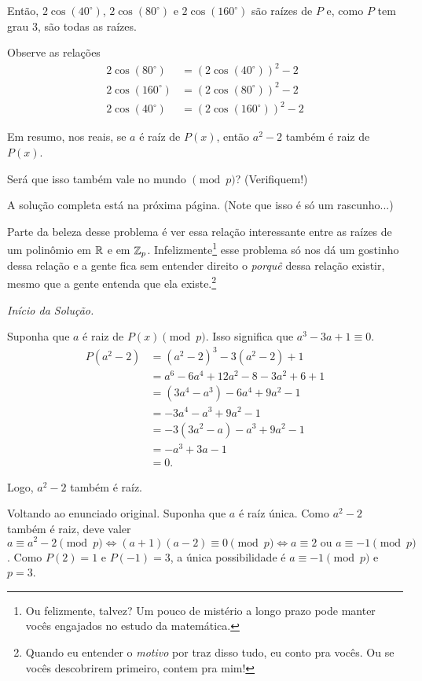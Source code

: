 \documentclass[10pt, a4paper]{article}
\begin{document}
		Então, $2\cos(40^\circ)$, $2\cos(80^\circ)$ e $2\cos(160^\circ)$ são raízes de $P$ e, como $P$ tem grau $3$, são todas as raízes.

		Observe as relações
		\begin{align*}
			2\cos(80^\circ)  & = (2\cos(40^\circ))^2 - 2\\
			2\cos(160^\circ) & = (2\cos(80^\circ))^2 - 2\\
			2\cos(40^\circ)  & = (2\cos(160^\circ))^2 - 2
		\end{align*}
	
		Em resumo, nos reais, se $a$ é raíz de $P(x)$, então $a^2 - 2$ também é raiz de $P(x)$.

		Será que isso também vale no mundo $\pmod{p}$? (Verifiquem!)

		A solução completa está na próxima página. (Note que isso é só um rascunho...)

		Parte da beleza desse problema é ver essa relação interessante entre as raízes de um polinômio em $\mathbb{R}$ e em $\mathbb{Z}_p$. Infelizmente\footnote{Ou felizmente, talvez? Um pouco de mistério a longo prazo pode manter vocês engajados no estudo da matemática.} esse problema só nos dá um gostinho dessa relação e a gente fica sem entender direito o \textit{porquê} dessa relação existir, mesmo que a gente entenda que ela existe.\footnote{Quando eu entender o \textit{motivo} por traz disso tudo, eu conto pra vocês. Ou se vocês descobrirem primeiro, contem pra mim!}

		\newpage

		\noindent \textit{Início da Solução.}

		Suponha que $a$ é raiz de $P(x) \pmod{p}$. Isso significa que $a^3 - 3a + 1 \equiv 0$.
		\begin{align*}
			P(a^2 - 2) & = (a^2 - 2)^3 - 3(a^2 - 2) + 1 \\
					   & = a^6 - 6a^4 + 12a^2 - 8 - 3a^2 + 6 + 1\\
					   & = (3a^4 - a^3) - 6 a^4 + 9 a^2 - 1\\
					   & = -3a^4 - a^3 + 9a^2 - 1\\
					   & = -3(3a^2 - a) - a^3 + 9 a^2 - 1\\
					   & = -a^3 + 3a - 1\\
					   & = 0.
		\end{align*}
		
		Logo, $a^2 - 2$ também é raíz.

		Voltando ao enunciado original. Suponha que $a$ é raíz única. Como $a^2 - 2$ também é raiz, deve valer $a \equiv a^2 - 2 \pmod{p} \iff (a+1)(a-2) \equiv 0 \pmod{p} \iff a \equiv 2 \text{ ou } a \equiv -1 \pmod{p}$. Como $P(2) = 1$ e $P(-1) = 3$, a única possibilidade é $a \equiv -1 \pmod{p}$ e $p=3$.
\end{document}

